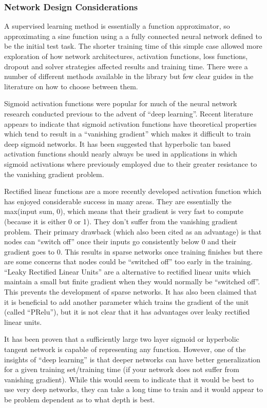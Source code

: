\documentclass[12pt]{article}
\begin{document}
\subsubsection{Network Design Considerations}

	A supervised learning method is essentially a function approximator, so approximating a sine function using a a fully connected neural network defined to be the initial test task.  The shorter training time of this simple case allowed more exploration of how network architectures, activation functions, loss functions, dropout and solver strategies affected results and training time.  There were a number of different methods available in the library but few clear guides in the literature on how to choose between them.

	Sigmoid activation functions were popular for much of the neural network research conducted previous to the advent of “deep learning”.  Recent literature appears to indicate that sigmoid activation functions have theoretical properties which tend to result in a “vanishing gradient” which makes it difficult to train deep sigmoid networks.  It has been suggested that hyperbolic tan based activation functions should nearly always be used in applications in which sigmoid activations where previously employed due to their greater resistance to the vanishing gradient problem.
  
	Rectified linear functions are a more recently developed activation function which has enjoyed considerable success in many areas.  They are essentially the max(input sum, 0), which means that their gradient is very fast to compute (because it is either 0 or 1).  They don't suffer from the vanishing gradient problem.  Their primary drawback (which also been cited as an advantage) is that nodes can “switch off” once their inputs go consistently below 0 and their gradient goes to 0.  This results in sparse networks once training finishes but there are some concerns that nodes could be “switched off” too early in the training.  “Leaky Rectified Linear Units” are a alternative to rectified linear units which maintain a small but finite gradient when they would normally be “switched off”.  This prevents the development of sparse networks.  It has also been claimed that it is beneficial to add another parameter which trains the gradient of the unit  (called “PRelu”), but it is not clear that it has advantages over leaky rectified linear units.

	It has been proven that a sufficiently large two layer sigmoid or hyperbolic tangent network is capable of representing any function.  However, one of the insights of “deep learning” is that deeper networks can have better generalization for a given training set/training time (if your network does not suffer from vanishing gradient).  While this would seem to indicate that it would be best to use very deep networks,  they can take a long time to train and it would appear to be problem dependent as to what depth is best.
\end{document}
